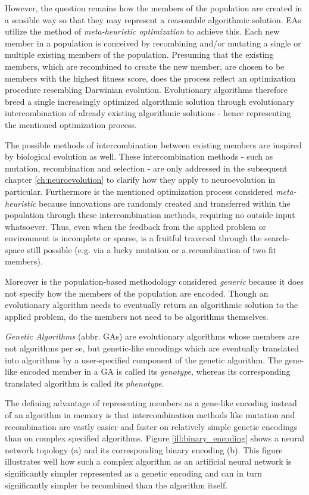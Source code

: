 \documentclass[journal, a4paper]{IEEEtran}
\begin{document}
However, the question remains how the members of the population are created in a sensible way so that they may represent a reasonable algorithmic solution. EAs utilize the method of \textit{meta-heuristic optimization} to achieve this. Each new member in a population is conceived by recombining and/or mutating a single or multiple existing members of the population. Presuming that the existing members, which are recombined to create the new member, are chosen to be members with the highest fitness score, does the process reflect an optimization procedure resembling Darwinian evolution. Evolutionary algorithms therefore breed a single increasingly optimized algorithmic solution through evolutionary intercombination of already existing algorithmic solutions - hence representing the mentioned optimization process. 

The possible methods of intercombination between existing members are inspired by biological evolution as well. These intercombination methods - such as mutation, recombination and selection - are only addressed in the subsequent chapter \ref{ch:neuroevolution} to clarify how they apply to neuroevolution in particular. Furthermore is the mentioned optimization process considered \textit{meta-heuristic} because innovations are randomly created and transferred within the population through these intercombination methods, requiring no outside input whatsoever. Thus, even when the feedback from the applied problem or environment is incomplete or sparse, is a fruitful traversal through the search-space still possible (e.g. via a lucky mutation or a recombination of two fit members).

Moreover is the population-based methodology considered \textit{generic} because it does not specify how the members of the population are encoded. Though an evolutionary algorithm needs to eventually return an algorithmic solution to the applied problem, do the members not need to be algorithms themselves.

\textit{Genetic Algorithms} (abbr. GAs) are evolutionary algorithms whose members are not algorithms per se, but genetic-like encodings which are eventually translated into algorithms by a user-specified component of the genetic algorithm. The gene-like encoded member in a GA is called its \textit{genotype}, whereas its corresponding translated algorithm is called its \textit{phenotype}.

The defining advantage of representing members as a gene-like encoding instead of an algorithm in memory is that intercombination methods like mutation and recombination are vastly easier and faster on relatively simple genetic encodings than on complex specified algorithms. Figure \ref{ill:binary_encoding} shows a neural network topology (a) and its corresponding binary encoding (b). This figure illustrates well how such a complex algorithm as an artificial neural network is significantly simpler represented as a genetic encoding and can in turn significantly simpler be recombined than the algorithm itself.
\end{document}

